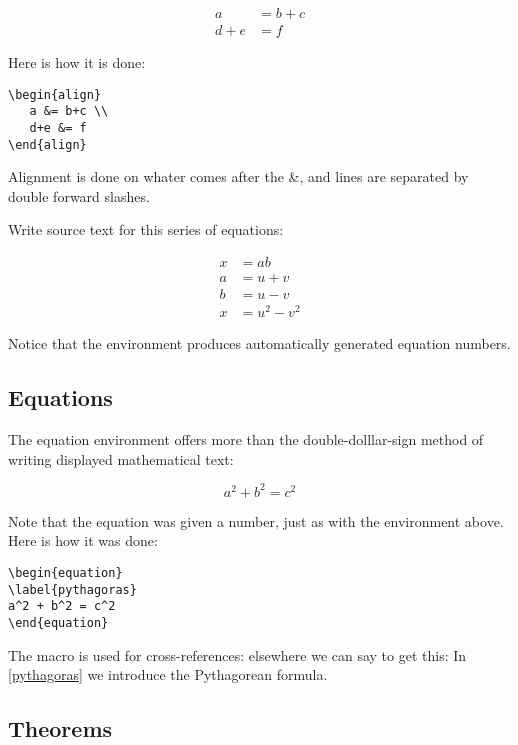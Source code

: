\begin{align}
   a &= b+c \\
   d+e &= f
\end{align}

Here is how it is done:

\begin{verbatim}
\begin{align}
   a &= b+c \\
   d+e &= f
\end{align}
\end{verbatim}

Alignment is done on whater comes after the &, and lines are separated by double forward slashes.

 Write source text for this series of equations:

\begin{align}
x &= ab \\
a &= u + v \\
b &= u - v \\
x &= u^2 - v^2
\end{align}

Notice that the  environment produces automatically generated equation numbers.

\subsection{Equations}

The equation environment offers more than the double-dolllar-sign method of writing displayed mathematical text:

\begin{equation}
\label{pythagoras}
a^2 + b^2 = c^2
\end{equation}

Note that the equation was given a number, just as with the  environment above.  Here is how it was done:

\begin{verbatim}
\begin{equation}
\label{pythagoras}
a^2 + b^2 = c^2
\end{equation}
\end{verbatim}

The  macro is used for cross-references: elsewhere we can say  to get this: In \eqref{pythagoras} we introduce the Pythagorean formula.


\subsection{Theorems}

